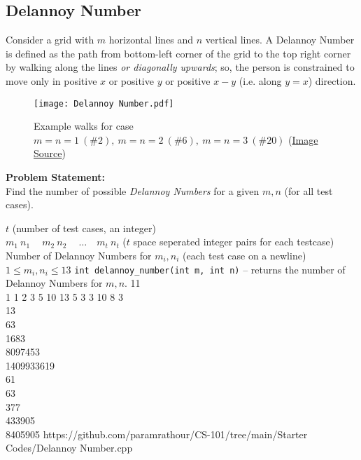 \documentclass[../../Problems]{subfiles}
\begin{document}
\subsection{Delannoy Number}{\label{pp:delannoynumber}}
Consider a grid with $m$ horizontal lines and $n$ vertical lines. A Delannoy Number is defined as the path from bottom-left corner of the grid to the top right corner by walking along the lines \emph{or diagonally upwards}; so, the person is constrained to move only in positive $x$ or positive $y$ or positive $x-y$ (i.e. along $y=x$) direction.
\begin{figure}[H]
	\centering
	\texttt{[image: Delannoy Number.pdf]}
	\caption{Example walks for case $m=n=1\ (\#2),\ m=n=2\ (\#6),\ m=n=3\ (\#20)$ (\href{https://mathworld.wolfram.com/DelannoyNumber.html}{Image Source})}
	\label{fig:delannoynumber}
\end{figure}
\vspace{-1em}
\textbf{Problem Statement:}\\
Find the number of possible \emph{Delannoy Numbers} for a given $m,n$ (for all test cases).
\begin{testcasesFunction}
	{$t$ \hfill(number of test cases, an integer)\\
	$m_1\ n_1\ \quad m_2\ n_2\ \quad \ldots\quad m_t\ n_t$ \hfill($t$ space seperated integer pairs for each testcase)}
	{Number of Delannoy Numbers for $m_i, n_i$  \hfill(each test case on a newline)}
	{$1 \leq m_i, n_i \leq 13$}
	{\texttt{int delannoy\_number(int m, int n)} -- returns the number of Delannoy Numbers for $m,n$.}
	{11\\1 1 2 3 5 10 13 5 3 3 10 8}
	{3\\13\\63\\1683\\8097453\\1409933619\\61\\63\\377\\433905\\8405905}
	{https://github.com/paramrathour/CS-101/tree/main/Starter Codes/Delannoy Number.cpp}
\end{testcasesFunction}
\end{document}
